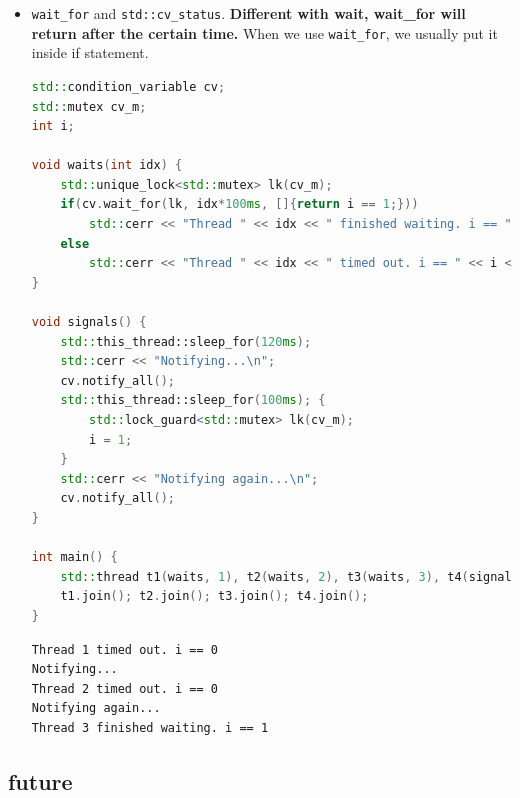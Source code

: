 \documentclass[a4paper,11pt,twoside]{book}
\begin{document}
\begin{itemize}
    \item \texttt{wait\_for} and \texttt{std::cv\_status}. \textbf{Different with wait, wait\_for will return after the certain time. } When we use \texttt{wait\_for}, we usually put it inside if statement. 

\begin{lstlisting}[frame=single, language=c++]
std::condition_variable cv;
std::mutex cv_m;
int i;

void waits(int idx) {
	std::unique_lock<std::mutex> lk(cv_m);
	if(cv.wait_for(lk, idx*100ms, []{return i == 1;})) 
		std::cerr << "Thread " << idx << " finished waiting. i == " << i << '\n';
	else
		std::cerr << "Thread " << idx << " timed out. i == " << i << '\n';
}

void signals() {
	std::this_thread::sleep_for(120ms);
	std::cerr << "Notifying...\n";
	cv.notify_all();
	std::this_thread::sleep_for(100ms); {
		std::lock_guard<std::mutex> lk(cv_m);
		i = 1;
	}
	std::cerr << "Notifying again...\n";
	cv.notify_all();
}

int main() {
	std::thread t1(waits, 1), t2(waits, 2), t3(waits, 3), t4(signals);
	t1.join(); t2.join(); t3.join(); t4.join();
}

\end{lstlisting}

\begin{lstlisting}
Thread 1 timed out. i == 0
Notifying...
Thread 2 timed out. i == 0
Notifying again...
Thread 3 finished waiting. i == 1
\end{lstlisting}


\end{itemize}

\subsection{future}
\end{document}
